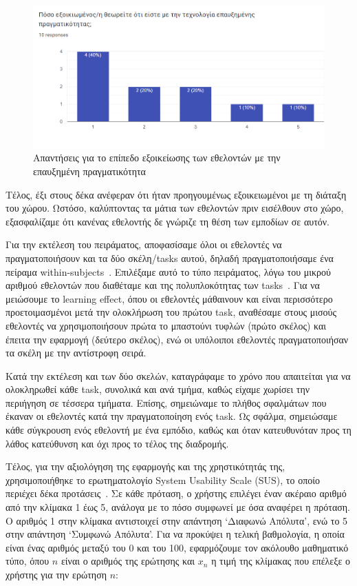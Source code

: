 \begin{figure}[!h]
    \centering
    \includegraphics[width=1\textwidth]{images/questionnaire_familiarityAR.png}
    \caption{Απαντήσεις για το επίπεδο εξοικείωσης των εθελοντών με την επαυξημένη πραγματικότητα}\label{fig:questARFamiliariaty}
\end{figure}

Τέλος, έξι στους δέκα ανέφεραν ότι ήταν προηγουμένως εξοικειωμένοι με τη διάταξη του χώρου. Ωστόσο, καλύπτοντας τα μάτια των εθελοντών πριν εισέλθουν στο χώρο, εξασφαλίζαμε ότι κανένας εθελοντής δε γνώριζε τη θέση των εμποδίων σε αυτόν.

Για την εκτέλεση του πειράματος, αποφασίσαμε όλοι οι εθελοντές να πραγματοποιήσουν και τα δύο σκέλη/tasks αυτού, δηλαδή πραγματοποιήσαμε ένα πείραμα within-subjects~\cite{bhandari_2021_withinsubjects}. Επιλέξαμε αυτό το τύπο πειράματος, λόγω του μικρού αριθμού εθελοντών που διαθέταμε και της πολυπλοκότητας των tasks~\cite{lazar_2017_research}. Για να μειώσουμε το learning effect, όπου οι εθελοντές μάθαινουν και είναι περισσότερο προετοιμασμένοι μετά την ολοκλήρωση του πρώτου task, αναθέσαμε στους μισούς εθελοντές να χρησιμοποιήσουν πρώτα το μπαστούνι τυφλών (πρώτο σκέλος) και έπειτα την εφαρμογή (δεύτερο σκέλος), ενώ οι υπόλοιποι εθελοντές πραγματοποιήσαν τα σκέλη με την αντίστροφη σειρά.

Κατά την εκτέλεση και των δύο σκελών, καταγράφαμε το χρόνο που απαιτείται για να ολοκληρωθεί κάθε task, συνολικά και ανά τμήμα, καθώς είχαμε χωρίσει την περιήγηση σε τέσσερα τμήματα. Επίσης, σημειώναμε το πλήθος σφαλμάτων που έκαναν οι εθελοντές κατά την πραγματοποίηση ενός task. Ως σφάλμα, σημειώσαμε κάθε σύγκρουση ενός εθελοντή με ένα εμπόδιο, καθώς και όταν κατευθυνόταν προς τη λάθος κατεύθυνση και όχι προς το τέλος της διαδρομής.

Τέλος, για την αξιολόγηση της εφαρμογής και της χρηστικότητάς της, χρησιμοποιήθηκε το ερωτηματολογίο System Usability Scale (SUS), το οποίο περιέχει δέκα προτάσεις~\cite{brooke_1995_sus}. Σε κάθε πρόταση, ο χρήστης επιλέγει έναν ακέραιο αριθμό από την κλίμακα 1 έως 5, ανάλογα με το πόσο συμφωνεί με όσα αναφέρει η πρόταση. Ο αριθμός 1 στην κλίμακα αντιστοιχεί στην απάντηση `Διαφωνώ Απόλυτα', ενώ το 5 στην απάντηση `Συμφωνώ Απόλυτα'. Για να προκύψει η τελική βαθμολογία, η οποία είναι ένας αριθμός μεταξύ του 0 και του 100, εφαρμόζουμε τον ακόλουθο μαθηματικό τύπο, όπου $n$ είναι ο αριθμός της ερώτησης και $x_n$ η τιμή της κλίμακας που επέλεξε ο χρήστης για την ερώτηση $n$:

